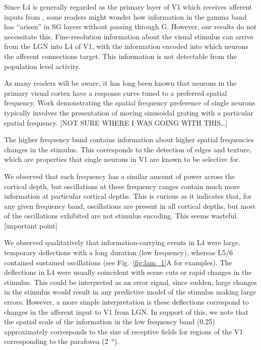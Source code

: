 Since \ac{L4} is generally regarded as the primary layer of \ac{V1} which receives afferent inputs from , some readers might wonder how information in the gamma band has ``arisen'' in \ac{SG} layers without passing through \ac{G}.
However, our results do not necessitate this.
Fine-resolution information about the visual stimulus can arrive from the \ac{LGN} into \ac{L4} of \ac{V1}, with the information encoded into which neurons the afferent connections target.
This information is not detectable from the population level activity.


As many readers will be aware, it has long been known that neurons in the primary visual cortex have a response curve tuned to a preferred spatial frequency.
Work demonstrating the spatial frequency preference of single neurons typically involves the presentation of moving sinusoidal grating with a particular spatial frequency.
[NOT SURE WHERE I WAS GOING WITH THIS{\dots}]

The higher frequency band contains information about higher spatial frequencies changes in the stimulus.
This corresponds to the detection of edges and texture, which are properties that single neurons in \ac{V1} are known to be selective for.


We observed that each frequency has a similar amount of power across the cortical depth, but oscillations at these frequency ranges contain much more information at particular cortical depths.
This is curious as it indicates that, for any given frequency band, oscillations are present in all cortical depths, but most of the oscillations exhibited are not stimulus encoding.
This seems wasteful.
[important point]

We observed qualitatively that information-carrying events in \ac{L4} were large, temporary deflections with a long duration (low frequency), whereas \acs{L5}/6 contained sustained oscillations (see Fig.~\ref{fig:lam_1}A for examples).
The deflections in \ac{L4} were usually coincident with scene cuts or rapid changes in the stimulus.
This could be interpreted as an error signal, since sudden, large changes in the stimulus would result in any predictive model of the stimulus making large errors.
However, a more simple interpretation is these deflections correspond to changes in the afferent input to \ac{V1} from \ac{LGN}.
In support of this, we note that the spatial scale of the information in the low frequency band (\SI{0.25}{\cpd}) approximately corresponds to the size of receptive fields for regions of the \ac{V1} corresponding to the parafovea (\SI{2}{\degree}).


